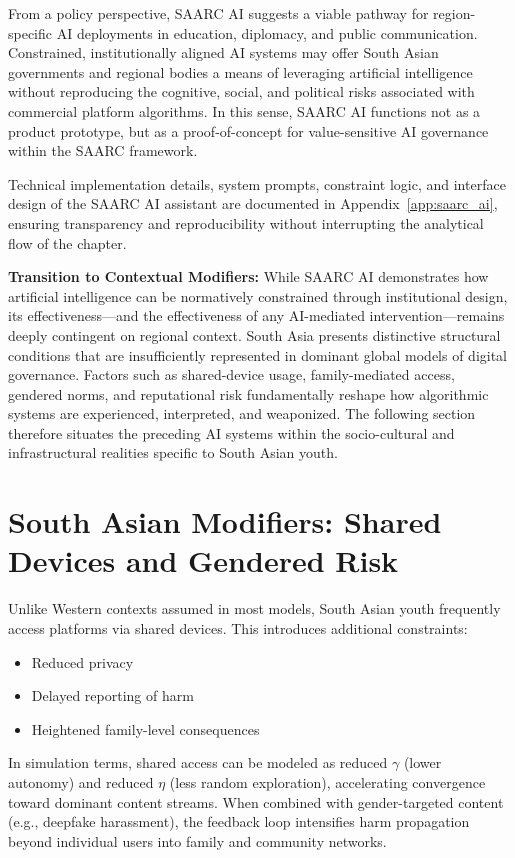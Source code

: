 \documentclass[12pt,a4paper]{report}
\begin{document}
From a policy perspective, SAARC AI suggests a viable pathway for region-specific AI deployments in education, diplomacy, and public communication. Constrained, institutionally aligned AI systems may offer South Asian governments and regional bodies a means of leveraging artificial intelligence without reproducing the cognitive, social, and political risks associated with commercial platform algorithms. In this sense, SAARC AI functions not as a product prototype, but as a proof-of-concept for value-sensitive AI governance within the SAARC framework.

Technical implementation details, system prompts, constraint logic, and interface design of the SAARC AI assistant are documented in Appendix~\ref{app:saarc_ai}, ensuring transparency and reproducibility without interrupting the analytical flow of the chapter.

\textbf{Transition to Contextual Modifiers:} While SAARC AI demonstrates how artificial intelligence can be normatively constrained through institutional design, its effectiveness—and the effectiveness of any AI-mediated intervention—remains deeply contingent on regional context. South Asia presents distinctive structural conditions that are insufficiently represented in dominant global models of digital governance. Factors such as shared-device usage, family-mediated access, gendered norms, and reputational risk fundamentally reshape how algorithmic systems are experienced, interpreted, and weaponized. The following section therefore situates the preceding AI systems within the socio-cultural and infrastructural realities specific to South Asian youth.



\section{South Asian Modifiers: Shared Devices and Gendered Risk}

Unlike Western contexts assumed in most models, South Asian youth frequently access platforms via shared devices. This introduces additional constraints:

\begin{itemize}
  \item Reduced privacy
  \item Delayed reporting of harm
  \item Heightened family-level consequences
\end{itemize}

In simulation terms, shared access can be modeled as reduced $\gamma$ (lower autonomy) and reduced $\eta$ (less random exploration), accelerating convergence toward dominant content streams. When combined with gender-targeted content (e.g., deepfake harassment), the feedback loop intensifies harm propagation beyond individual users into family and community networks.
\end{document}
